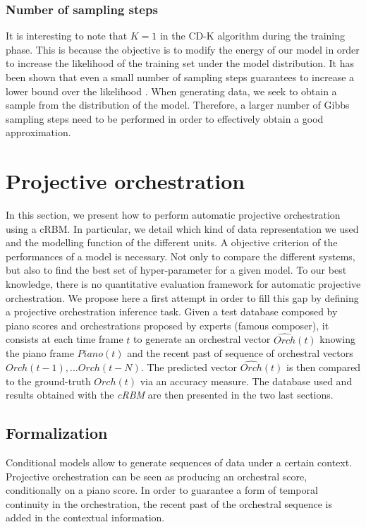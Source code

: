 \documentclass[letterpaper]{article}
\begin{document}
\subsubsection{Number of sampling steps} It is interesting to note that $K=1$ in the CD-K algorithm during the training phase. This is because the objective is to modify the energy of our model in order to increase the likelihood  of the training set under the model distribution. It has been shown that even a small number of sampling steps guarantees to increase a lower bound over the likelihood \cite{bengio2009learning}. When generating data, we seek to obtain a sample from the distribution of the model. Therefore, a larger number of Gibbs sampling steps need to be performed in order to effectively obtain a good approximation.

\section{Projective orchestration}
In this section, we present how to perform automatic projective orchestration using a cRBM. In particular, we detail which kind of data representation we used and the modelling function of the different units.
A objective criterion of the performances of a model is necessary. Not only to compare the different systems, but also to find the best set of hyper-parameter for a given model. To our best knowledge, there is no quantitative evaluation framework for automatic projective orchestration. We propose here a first attempt in order to fill this gap by defining a projective orchestration inference task. Given a test database composed by piano scores and orchestrations proposed by experts (famous composer), it consists at each time frame $t$ to generate an orchestral vector $\hat{Orch}(t)$ knowing the piano frame $Piano(t)$ and the recent past of sequence of orchestral vectors $Orch(t-1),... Orch(t-N)$. The predicted vector $\hat{Orch}(t)$ is then compared to the ground-truth $Orch(t)$ via an accuracy measure.
The database used and results obtained with the \textit{cRBM} are then presented in the two last sections.

\subsection{Formalization}
Conditional models allow to generate sequences of data under a certain context. Projective orchestration can be seen as producing an orchestral score, conditionally on a piano score. In order to guarantee a form of temporal continuity in the orchestration, the recent past of the orchestral sequence is added in the contextual information.
\end{document}
